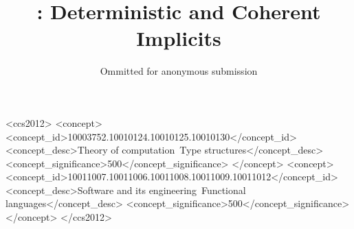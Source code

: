 \documentclass[acmlarge, anonymous, review, authorname]{acmart}
\begin{document}

\title{\name: Deterministic and Coherent Implicits}
\author{Ommitted for anonymous submission}

\begin{abstract}

\end{abstract}
\begin{CCSXML}
<ccs2012>
<concept>
<concept_id>10003752.10010124.10010125.10010130</concept_id>
<concept_desc>Theory of computation~Type structures</concept_desc>
<concept_significance>500</concept_significance>
</concept>
<concept>
<concept_id>10011007.10011006.10011008.10011009.10011012</concept_id>
<concept_desc>Software and its engineering~Functional languages</concept_desc>
<concept_significance>500</concept_significance>
</concept>
</ccs2012>
\end{CCSXML}


\begin{comment}
\category{D.3.2}{Programming Languages}   
                {Language Classifications}
                [Functional Languages, Object-Oriented Languages]
\category{F.3.3}{Logics and Meanings of Programs}   
                {Studies of Program Constructs}
                []

\terms{Languages}

\keywords{
Implicit parameters, type classes, C++ concepts, generic programming,
Haskell, Scala}

\acmformat{Oliveira, B. C. d. S., Schrijvers, T., Choi, W., Lee, W., Yi, K., Wadler, P.
201?. The implicit calculus: a new foundation for generic programming.}

\begin{bottomstuff}
Author's addresses: 
B. C. d. S. Oliveira, Department of Computer Science, Hong Kong University; 
T. Schrijvers, Department of Applied Mathematics and Computer Science, Ghent University;
W. Choi {and} W. Lee {and} K. Yi, \ldots, Seoul National University;
P. Wadler, \ldots, University of Edinburgh.
\end{bottomstuff}
\end{comment}

\maketitle
\end{document}
